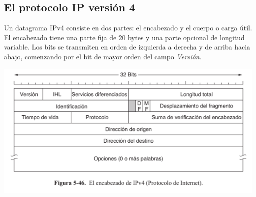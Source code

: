 	\subsection{El protocolo IP versión 4}
	Un datagrama IPv4 consiste en dos partes: el encabezado y el cuerpo o carga útil. El encabezado tiene una parte fija de 20 bytes y una parte opcional de longitud variable. Los bits se transmiten en orden de izquierda a derecha y de arriba hacia abajo, comenzando por el bit de mayor orden del campo \textit{Versión}.
	
	\begin{center}
		\includegraphics[scale=0.3]{./imagenes/encabezadoIP.png} 
	\end{center}
	
